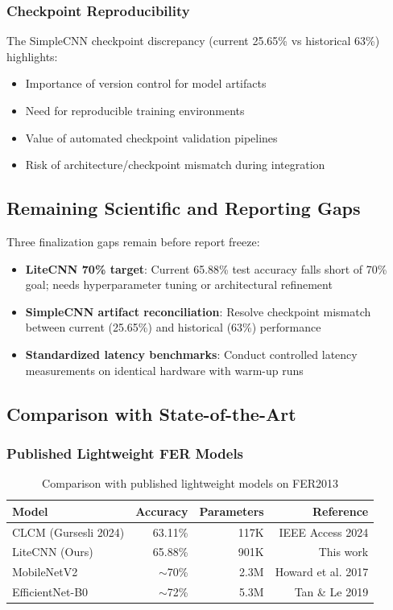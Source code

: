 \documentclass[12pt,a4paper]{article}
\begin{document}
\subsubsection{Checkpoint Reproducibility}
The SimpleCNN checkpoint discrepancy (current 25.65\% vs historical 63\%) highlights:
\begin{itemize}[leftmargin=*]
    \item Importance of version control for model artifacts
    \item Need for reproducible training environments
    \item Value of automated checkpoint validation pipelines
    \item Risk of architecture/checkpoint mismatch during integration
\end{itemize}

\subsection{Remaining Scientific and Reporting Gaps}
Three finalization gaps remain before report freeze:
\begin{itemize}[leftmargin=*]
    \item \textbf{LiteCNN 70\% target}: Current 65.88\% test accuracy falls short of 70\% goal; needs hyperparameter tuning or architectural refinement
    \item \textbf{SimpleCNN artifact reconciliation}: Resolve checkpoint mismatch between current (25.65\%) and historical (63\%) performance  
    \item \textbf{Standardized latency benchmarks}: Conduct controlled latency measurements on identical hardware with warm-up runs
\end{itemize}

\subsection{Comparison with State-of-the-Art}

\subsubsection{Published Lightweight FER Models}
\begin{table}[h!]
\centering
\begin{tabular}{lrrr}
\toprule
Model & Accuracy & Parameters & Reference \\
\midrule
CLCM (Gursesli 2024) & 63.11\% & 117K & IEEE Access 2024 \\
LiteCNN (Ours) & 65.88\% & 901K & This work \\
MobileNetV2 & $\sim$70\% & 2.3M & Howard et al. 2017 \\
EfficientNet-B0 & $\sim$72\% & 5.3M & Tan \& Le 2019 \\
\bottomrule
\end{tabular}
\caption{Comparison with published lightweight models on FER2013}
\label{tab:sota_comparison}
\end{table}
\end{document}
